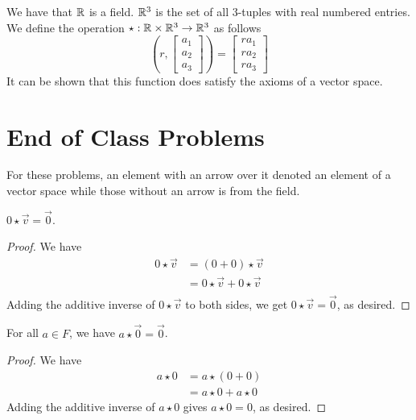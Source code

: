 \documentclass[main.tex]{subfiles}
\begin{document}
    \begin{example}{}{}
        We have that $\mathbb{R}$ is a field. $\mathbb{R}^3$ is the set of all 3-tuples with real numbered entries. We define the operation $\star: \mathbb{R} \times \mathbb{R}^3 \to \mathbb{R}^3$ as follows
        \begin{equation*}
            \left( r, \begin{bmatrix} a_1 \\ a_2 \\ a_3 \end{bmatrix} \right) = \begin{bmatrix} ra_1 \\ ra_2 \\ ra_3 \end{bmatrix}
        \end{equation*}
        It can be shown that this function does satisfy the axioms of a vector space.
    \end{example}

    \section{End of Class Problems}
    For these problems, an element with an arrow over it denoted an element of a vector space while those without an arrow is from the field.
    \begin{prop}{}{}
        $0 \star \Vec{v} = \Vec{0}$.
    \end{prop}
    \begin{proof}
        We have 
        \begin{align*}
            0 \star \Vec{v} &= (0 + 0) \star \Vec{v} \\
            &= 0\star \Vec{v} + 0 \star \Vec{v} \\
        \end{align*}
        Adding the additive inverse of $0\star \Vec{v}$ to both sides, we get $0\star \Vec{v} = \Vec{0}$, as desired.
    \end{proof}

    \begin{prop}{}{}
        For all $a\in F$, we have $a\star \Vec{0} = \Vec{0}$. 
    \end{prop}
    \begin{proof}
        We have 
        \begin{align*}
            a \star 0 &= a \star (0 + 0) \\
            &= a\star 0 + a\star 0
        \end{align*}
        Adding the additive inverse of $a\star 0$ gives $a\star 0 = 0$, as desired.
    \end{proof}
\end{document}

